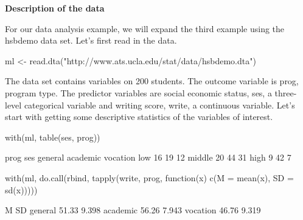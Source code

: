 \begin{frame}[fragile]

\textbf{Description of the data}
 
For our data analysis example, we will expand the third example using the hsbdemo data set. Let's first read in the data.
 


ml <- read.dta("http://www.ats.ucla.edu/stat/data/hsbdemo.dta")
 
The data set contains variables on 200 students. The outcome variable is prog, program type. The predictor variables are social economic status, ses, a three-level categorical variable and writing score, write, a continuous variable. Let's start with getting some descriptive statistics of the variables of interest.
 
\begin{frame}[fragile]


with(ml, table(ses, prog))
 
         prog
 ses      general academic vocation
   low         16       19       12
   middle      20       44       31
   high         9       42        7
 
with(ml, do.call(rbind, tapply(write, prog, function(x) c(M = mean(x), SD = sd(x)))))
 
              M    SD
 general  51.33 9.398
 academic 56.26 7.943
 vocation 46.76 9.319
 

\end{frame}
\end{frame}
